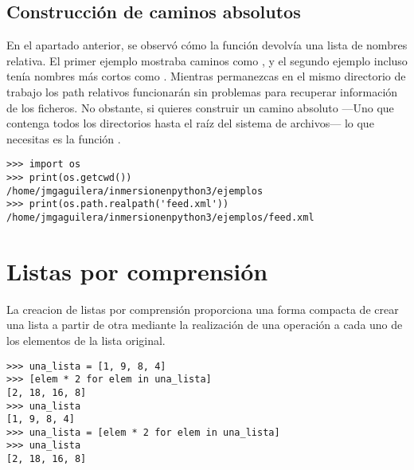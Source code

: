 \subsection{Construcción de caminos absolutos}

En el apartado anterior, se observó cómo la función  devolvía una lista de nombres relativa. El primer ejemplo mostraba caminos como , y el segundo ejemplo incluso tenía nombres más cortos como . Mientras permanezcas en el mismo directorio de trabajo los path relativos funcionarán sin problemas para recuperar información de los ficheros. No obstante, si quieres construir un camino absoluto ---Uno que contenga todos los directorios hasta el raíz del sistema de archivos--- lo que necesitas es la función .

\noindent\begin{minipage}{\textwidth}
\begin{lstlisting}[mathescape=True]
>>> import os
>>> print(os.getcwd())
/home/jmgaguilera/inmersionenpython3/ejemplos
>>> print(os.path.realpath('feed.xml'))
/home/jmgaguilera/inmersionenpython3/ejemplos/feed.xml
\end{lstlisting}
\end{minipage}

\section{Listas por comprensión}

La creacion de listas por comprensión proporciona una forma compacta de crear una lista a partir de otra mediante la realización de una operación a cada uno de los elementos de la lista original.

\noindent\begin{minipage}{\textwidth}
\begin{lstlisting}[mathescape=True]
>>> una_lista = [1, 9, 8, 4]
>>> [elem * 2 for elem in una_lista]
[2, 18, 16, 8]
>>> una_lista
[1, 9, 8, 4]
>>> una_lista = [elem * 2 for elem in una_lista]
>>> una_lista
[2, 18, 16, 8]
\end{lstlisting}
\end{minipage}

